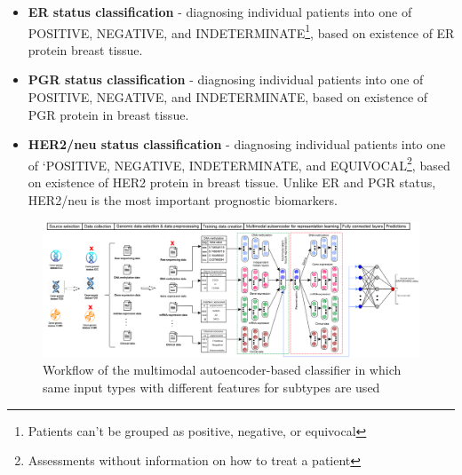 \begin{itemize}
    \item \textbf{ER status classification} - diagnosing individual patients into one of POSITIVE, NEGATIVE, and INDETERMINATE\footnote{Patients can't be grouped as positive, negative, or equivocal}, based on existence of ER protein breast tissue. 
    \item \textbf{PGR status classification} - diagnosing individual patients into one of POSITIVE, NEGATIVE, and INDETERMINATE, based on existence of PGR protein in breast tissue. 
    \item \textbf{HER2/neu status classification} - diagnosing individual patients into one of `POSITIVE, NEGATIVE, INDETERMINATE, and EQUIVOCAL\footnote{Assessments without information on how to treat a patient}, based on existence of HER2 protein in breast tissue. Unlike ER and PGR status, HER2/neu is the most important prognostic biomarkers. 
\end{itemize}

\begin{figure}
	\centering
	\includegraphics[scale=0.75]{images/mae_v2.png}
	\caption[Workflow of the multimodal autoencoder classifier]{Workflow of the multimodal autoencoder-based classifier in which same input types with different features for subtypes %
	are used~\cite{karimACCESS2019}}
	\label{fig:wf_mae}
\end{figure}

